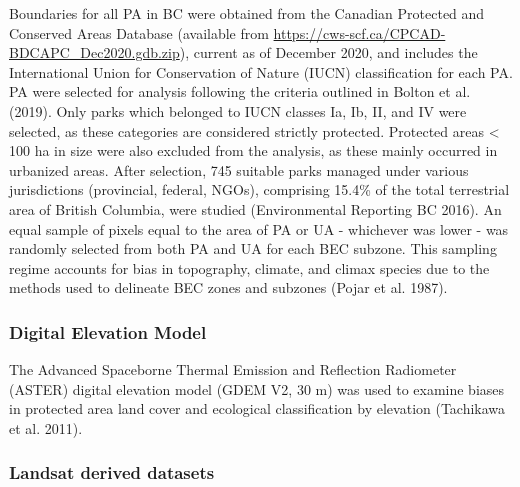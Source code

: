 \documentclass[10pt,oneside]{article}
\begin{document}
Boundaries for all PA in BC were obtained from the Canadian Protected
and Conserved Areas Database (available from
\url{https://cws-scf.ca/CPCAD-BDCAPC_Dec2020.gdb.zip}), current as of
December 2020, and includes the International Union for Conservation of
Nature (IUCN) classification for each PA. PA were selected for analysis
following the criteria outlined in Bolton et al. (2019). Only parks
which belonged to IUCN classes Ia, Ib, II, and IV were selected, as
these categories are considered strictly protected. Protected areas
\textless{} 100 ha in size were also excluded from the analysis, as
these mainly occurred in urbanized areas. After selection, 745 suitable
parks managed under various jurisdictions (provincial, federal, NGOs),
comprising 15.4\% of the total terrestrial area of British Columbia,
were studied (Environmental Reporting BC 2016). An equal sample of
pixels equal to the area of PA or UA - whichever was lower - was
randomly selected from both PA and UA for each BEC subzone. This
sampling regime accounts for bias in topography, climate, and climax
species due to the methods used to delineate BEC zones and subzones
(Pojar et al. 1987).

\hypertarget{digital-elevation-model}{%
\subsubsection{Digital Elevation Model}\label{digital-elevation-model}}

The Advanced Spaceborne Thermal Emission and Reflection Radiometer
(ASTER) digital elevation model (GDEM V2, 30 m) was used to examine
biases in protected area land cover and ecological classification by
elevation (Tachikawa et al. 2011).

\hypertarget{landsat-derived-datasets}{%
\subsubsection{Landsat derived
datasets}\label{landsat-derived-datasets}}
\end{document}
